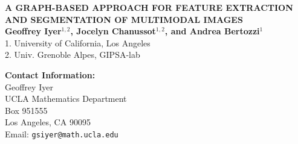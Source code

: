 \documentclass[a0,landscape]{a0poster}
\begin{document}


\begin{minipage}[b]{0.75\linewidth}
\veryHuge \color{NavyBlue} \textbf{A GRAPH-BASED APPROACH FOR FEATURE EXTRACTION\\ AND SEGMENTATION OF MULTIMODAL IMAGES} \color{Black}\\ %
\huge \textbf{Geoffrey Iyer$^{1,2}$, Jocelyn Chanussot$^{1,2}$, and Andrea Bertozzi$^1$}\\ %
\huge 1. University of California, Los Angeles \\2. Univ. Grenoble Alpes, GIPSA-lab
\end{minipage}
%
\begin{minipage}[b]{0.20\linewidth}
\color{DarkSlateGray}\Large \textbf{Contact Information:}\\
Geoffrey Iyer\\
UCLA Mathematics Department\\ %
Box 951555\\
Los Angeles, CA 90095\\
Email: \texttt{gsiyer@math.ucla.edu}\\ %
\end{minipage}
%

\vspace{1cm} %

\end{document}
